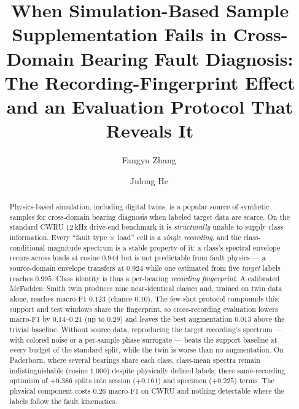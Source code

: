 \documentclass[preprint,12pt]{elsarticle}
\begin{document}
\begin{frontmatter}

\title{When Simulation-Based Sample Supplementation Fails in Cross-Domain Bearing
Fault Diagnosis: The Recording-Fingerprint Effect and an Evaluation Protocol
That Reveals It}


\author[1]{Fangyu Zhang\,}
\author[2]{Julong He\,}

\begin{abstract}
Physics-based simulation, including digital twins, is a
popular source of synthetic samples for cross-domain bearing
diagnosis when labeled target data are scarce. On the standard CWRU 12\,kHz
drive-end benchmark it is \emph{structurally} unable to supply
class information. Every ``fault type $\times$ load'' cell is a \emph{single
recording}, and the class-conditional magnitude spectrum is a stable property
of it: a class's spectral envelope recurs across loads at cosine
$0.944$ but is not predictable from fault physics --- a source-domain
envelope transfers at $0.924$ while one estimated from five
\emph{target} labels reaches $0.995$. Class identity is thus a
per-bearing \emph{recording fingerprint}. A calibrated McFadden--Smith twin
produces nine near-identical
classes and, trained on twin data alone, reaches macro-F1 $0.123$ (chance
$0.10$). The few-shot protocol compounds this:
support and test windows share the fingerprint, so cross-recording evaluation
lowers macro-F1 by $0.14$--$0.21$ (up to $0.29$) and leaves the best augmentation
$0.013$ above the trivial baseline. Without source data, reproducing the
target recording's spectrum --- with colored noise or a per-sample phase
surrogate --- beats the support baseline at every budget of the standard split,
while the twin is worse than no augmentation. On Paderborn, where several bearings share each class, class-mean
spectra remain indistinguishable (cosine $1.000$) despite physically defined
labels; there same-recording optimism of $+0.386$ splits
into session ($+0.161$) and specimen ($+0.225$) terms. The physical component
costs $0.26$ macro-F1 on CWRU and nothing detectable where the labels follow the
fault kinematics.
\end{abstract}


\end{frontmatter}
\end{document}
